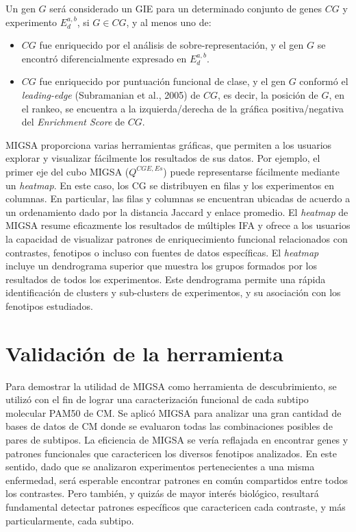 \documentclass[12pt,twoside]{reedthesis}
\providecommand{\tightlist}{%
  \setlength{\itemsep}{0pt}\setlength{\parskip}{0pt}}
\begin{document}
Un gen \(G\) será considerado un GIE para un determinado conjunto de genes \(CG\) y experimento \(E_{d}^{a,b}\), si \(G \in CG\), y al menos uno de:
\begin{itemize}
\tightlist
\item
  \(CG\) fue enriquecido por el análisis de sobre-representación, y el gen \(G\) se encontró diferencialmente expresado en \(E_{d}^{a,b}\).
\item
  \(CG\) fue enriquecido por puntuación funcional de clase, y el gen \(G\) conformó el \emph{leading-edge} (Subramanian et al., 2005) de \(CG\), es decir, la posición de \(G\), en el rankeo, se encuentra a la izquierda/derecha de la gráfica positiva/negativa del \emph{Enrichment Score} de \(CG\).
\end{itemize}
\par

MIGSA proporciona varias herramientas gráficas, que permiten a los usuarios explorar y visualizar fácilmente los resultados de sus datos. Por ejemplo, el primer eje del cubo MIGSA (\(Q^{CGE,Es}\)) puede representarse fácilmente mediante un \emph{heatmap}. En este caso, los CG se distribuyen en filas y los experimentos en columnas. En particular, las filas y columnas se encuentran ubicadas de acuerdo a un ordenamiento dado por la distancia Jaccard y enlace promedio. El \emph{heatmap} de MIGSA resume eficazmente los resultados de múltiples IFA y ofrece a los usuarios la capacidad de visualizar patrones de enriquecimiento funcional relacionados con contrastes, fenotipos o incluso con fuentes de datos específicas. El \emph{heatmap} incluye un dendrograma superior que muestra los grupos formados por los resultados de todos los experimentos. Este dendrograma permite una rápida identificación de clusters y sub-clusters de experimentos, y su asociación con los fenotipos estudiados.

\hypertarget{validaciuxf3n-de-la-herramienta}{%
\section{Validación de la herramienta}\label{validaciuxf3n-de-la-herramienta}}

\par

Para demostrar la utilidad de MIGSA como herramienta de descubrimiento, se utilizó con el fin de lograr una caracterización funcional de cada subtipo molecular PAM50 de CM. Se aplicó MIGSA para analizar una gran cantidad de bases de datos de CM donde se evaluaron todas las combinaciones posibles de pares de subtipos. La eficiencia de MIGSA se vería reflajada en encontrar genes y patrones funcionales que caractericen los diversos fenotipos analizados. En este sentido, dado que se analizaron experimentos pertenecientes a una misma enfermedad, será esperable encontrar patrones en común compartidos entre todos los contrastes. Pero también, y quizás de mayor interés biológico, resultará fundamental detectar patrones específicos que caractericen cada contraste, y más particularmente, cada subtipo.
\end{document}
